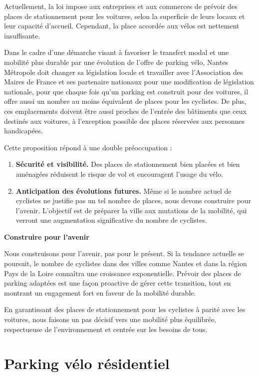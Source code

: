 Actuellement, la loi impose aux entreprises et aux commerces de
prévoir des places de stationnement pour les voitures, selon la
superficie de leurs locaux et leur capacité d'accueil. Cependant, la
place accordée aux vélos est nettement insuffisante.

Dans le cadre d'une démarche visant à favoriser le transfert modal et
une mobilité plus durable par une évolution de l’offre de parking
vélo, Nantes Métropole doit changer sa législation locale et
travailler avec l’Association des Maires de France et ses partenaire
nationaux pour une modification de législation nationale, pour que
chaque fois qu'un parking est construit pour des voitures, il offre
aussi un nombre au moins équivalent de places pour les cyclistes. De
plus, ces emplacements doivent être aussi proches de l'entrée des
bâtiments que ceux destinés aux voitures, à l'exception possible des
places réservées aux personnes handicapées.

Cette proposition répond à une double préoccupation :

\begin{enumerate}
\item \textbf{Sécurité et visibilité.} Des places de stationnement
  bien placées et bien aménagées réduisent le risque de vol et
  encouragent l'usage du vélo.
\item \textbf{Anticipation des évolutions futures.} Même si le nombre
  actuel de cyclistes ne justifie pas un tel nombre de places, nous
  devons construire pour l'avenir. L'objectif est de préparer la ville
  aux mutations de la mobilité, qui verront une augmentation
  significative du nombre de cyclistes.
\end{enumerate}

\textbf{Construire pour l'avenir}

Nous construisons pour l'avenir, pas pour le présent. Si la tendance
actuelle se poursuit, le nombre de cyclistes dans des villes comme
Nantes et dans la région Pays de la Loire connaîtra une croissance
exponentielle. Prévoir des places de parking adaptées est une façon
proactive de gérer cette transition, tout en montrant un engagement
fort en faveur de la mobilité durable.

En garantissant des places de stationnement pour les cyclistes à
parité avec les voitures, nous faisons un pas décisif vers une
mobilité plus équilibrée, respectueuse de l'environnement et centrée
sur les besoins de tous.


\section{Parking vélo résidentiel}

